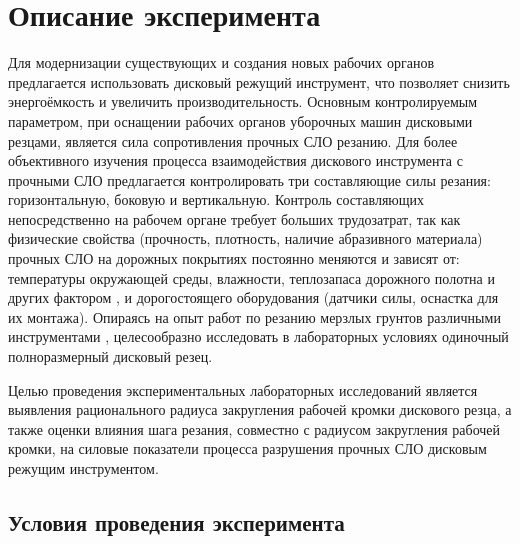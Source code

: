 \chapter{Описание эксперимента}\label{chapt2}

Для модернизации существующих и создания новых рабочих органов предлагается использовать дисковый режущий инструмент, что позволяет снизить энергоёмкость и увеличить производительность. Основным контролируемым параметром, при оснащении рабочих органов уборочных машин дисковыми резцами, является сила сопротивления прочных СЛО резанию. Для более объективного изучения процесса взаимодействия дискового инструмента с прочными СЛО предлагается контролировать три составляющие силы резания: горизонтальную, боковую и вертикальную. Контроль составляющих непосредственно на рабочем органе требует больших трудозатрат, так как физические свойства (прочность, плотность, наличие абразивного материала) прочных СЛО на дорожных покрытиях постоянно меняются и зависят от: температуры окружающей среды, влажности, теплозапаса дорожного полотна и других фактором \todo{[ссылка]}, и дорогостоящего оборудования (датчики силы, оснастка для их монтажа). Опираясь на опыт работ по резанию мерзлых грунтов различными инструментами \todo{[ссылки]}, целесообразно исследовать в лабораторных условиях одиночный полноразмерный дисковый резец.

Целью проведения экспериментальных лабораторных исследований является выявления рационального радиуса закругления рабочей кромки дискового резца, а также оценки влияния шага резания, совместно с радиусом закругления рабочей кромки, на силовые показатели процесса разрушения прочных СЛО дисковым режущим инструментом.

\section{Условия проведения эксперимента}\label{sect2_1}

